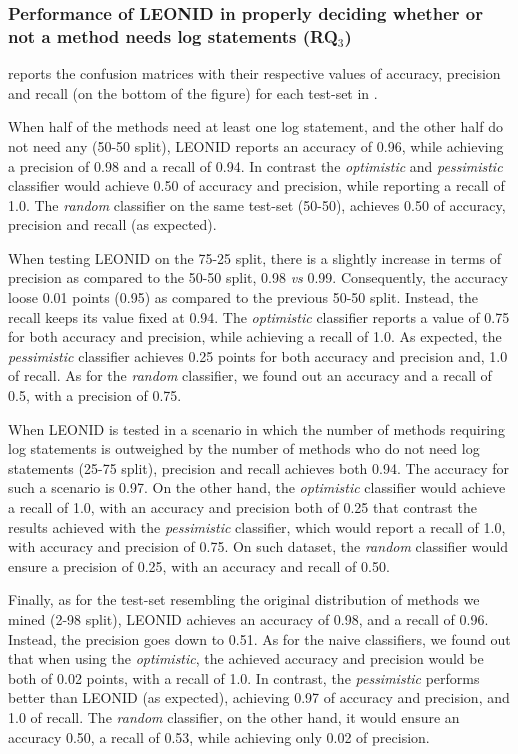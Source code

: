\subsubsection{Performance of LEONID in properly deciding whether or not a \java method needs log statements  (RQ$_{3}$)}
\label{sec:rq3}

 reports the confusion matrices with their respective values of accuracy, precision and recall (on the bottom of the figure) for each test-set in .

When half of the methods need at least one log statement, and the other half do not need any (50-50 split), LEONID reports an accuracy of 0.96, while achieving a precision of 0.98 and a recall of 0.94. In contrast the \textit{optimistic} and \textit{pessimistic} classifier would achieve 0.50 of accuracy and precision, while reporting a recall of 1.0. 
The \textit{random} classifier on the same test-set (50-50), achieves 0.50 of accuracy, precision and recall (as expected). 

When testing LEONID on the 75-25 split, there is a slightly increase in terms of precision as compared to the 50-50 split, 0.98 \emph{vs} 0.99. Consequently, the accuracy loose 0.01 points (0.95) as compared to the previous 50-50 split. Instead, the recall keeps its value fixed at 0.94.
The \textit{optimistic} classifier reports a value of 0.75 for both accuracy and precision, while achieving a recall of 1.0. As expected, the \textit{pessimistic} classifier achieves 0.25 points for both accuracy and precision and, 1.0 of recall. As for the \textit{random} classifier, we found out an accuracy and a recall of 0.5, with a precision of 0.75.

When LEONID is tested in a scenario in which the number of methods requiring log statements is outweighed by the number of methods who do not need log statements (25-75 split), precision and recall achieves both 0.94. The accuracy for such a scenario is 0.97. 
On the other hand, the \textit{optimistic} classifier would achieve a recall of 1.0, with an accuracy and precision both of 0.25 that contrast the results achieved with the \textit{pessimistic} classifier, which would report a recall of 1.0,  with accuracy and precision of 0.75. On such dataset, the \textit{random} classifier would ensure a precision of 0.25, with an accuracy and recall of 0.50.

Finally, as for the test-set resembling the original distribution of \java methods we mined (2-98 split), LEONID achieves an accuracy of 0.98, and a recall of 0.96. Instead, the precision goes down to 0.51.
As for the naive classifiers, we found out that when using the \textit{optimistic}, the achieved accuracy and precision would be both of 0.02 points, with a recall of 1.0.
In contrast, the \textit{pessimistic} performs better than LEONID (as expected), achieving 0.97 of accuracy and precision, and 1.0 of recall.
The \textit{random} classifier, on the other hand, it would ensure an accuracy 0.50, a recall of 0.53, while achieving only 0.02 of precision.





